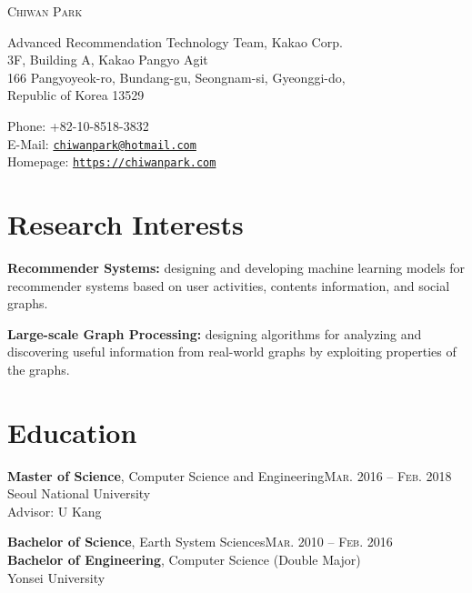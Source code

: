 \documentclass[11pt,a4paper]{article}
\makeatletter
\def\myname{Chiwan Park}
\def\myphone{+82-10-8518-3832}
\def\myaddress{Advanced Recommendation Technology Team, Kakao Corp.\\
3F, Building A, Kakao Pangyo Agit\\
166 Pangyoyeok-ro, Bundang-gu, Seongnam-si, Gyeonggi-do,\\
Republic of Korea 13529}
\def\myemail{chiwanpark@hotmail.com}
\def\myhomepage{https://chiwanpark.com}
\renewenvironment{itemize}{
  \begin{list}{}{
    \setlength{\leftmargin}{1.5em}
    \setlength{\itemsep}{0.5em}
    \setlength{\parskip}{0pt}
    \setlength{\parsep}{0.25em}
  }
}{
  \end{list}
}
\makeatother
\begin{document}
\par{\Huge \textsc{\myname}}

\bigskip

\begin{minipage}[t]{0.625\textwidth}
  \myaddress
\end{minipage}
\begin{minipage}[t]{0.375\textwidth}
  Phone: \myphone\\
  E-Mail: \href{mailto:\myemail}{\texttt{\myemail}}\\
  Homepage: \href{\myhomepage}{\texttt{\myhomepage}}
\end{minipage}

\section*{Research Interests}
\begin{itemize}
  \item \textbf{Recommender Systems:} designing and developing machine learning models for recommender systems based on user activities, contents information, and social graphs.
  \item \textbf{Large-scale Graph Processing:} designing algorithms for analyzing and discovering useful information from real-world graphs by exploiting properties of the graphs.
\end{itemize}

\section*{Education}
\begin{itemize}
  \item \textbf{Master of Science}, Computer Science and Engineering\hfill\textsc{Mar. 2016 -- Feb. 2018}\\
        Seoul National University\\
        Advisor: U Kang
  \item \textbf{Bachelor of Science}, Earth System Sciences\hfill\textsc{Mar. 2010 -- Feb. 2016}\\
        \textbf{Bachelor of Engineering}, Computer Science (Double Major)\\
        Yonsei University
\end{itemize}

\end{document}
